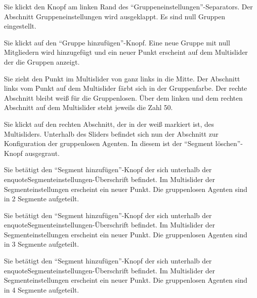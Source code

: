 \documentclass[parskip=full,11pt]{scrartcl}
\begin{document}
{Sie klickt den Knopf am linken Rand des \enquote{Gruppeneinstellungen}-Separators.}
{Der Abschnitt Gruppeneinstellungen wird ausgeklappt. Es sind null Gruppen eingestellt.}

{Sie klickt auf den \enquote{Gruppe hinzufügen}-Knopf.}
{Eine neue Gruppe mit null Mitgliedern wird hinzugefügt und ein neuer Punkt erscheint auf dem Multislider der die Gruppen anzeigt.}

{Sie zieht den Punkt im Multislider von ganz links in die Mitte.}
{Der Abschnitt links vom Punkt auf dem Multislider färbt sich in der Gruppenfarbe. Der rechte Abschnitt bleibt weiß für die Gruppenlosen. Über dem linken und dem rechten Abschnitt auf dem Multislider steht jeweils die Zahl 50.}

{Sie klickt auf den rechten Abschnitt, der in der weiß markiert ist, des Multisliders.}
{Unterhalb des Sliders befindet sich nun der Abschnitt zur Konfiguration der gruppenlosen Agenten. In diesem ist der \enquote{Segment löschen}-Knopf ausgegraut.}

{Sie betätigt den \enquote{Segment hinzufügen}-Knopf der sich unterhalb der enquote{Segmenteinstellungen}-Überschrift befindet.}
{Im Multislider der Segmenteinstellungen erscheint ein neuer Punkt. Die gruppenlosen Agenten sind in 2 Segmente aufgeteilt.}

{Sie betätigt den \enquote{Segment hinzufügen}-Knopf der sich unterhalb der enquote{Segmenteinstellungen}-Überschrift befindet.}
{Im Multislider der Segmenteinstellungen erscheint ein neuer Punkt. Die gruppenlosen Agenten sind in 3 Segmente aufgeteilt.}

{Sie betätigt den \enquote{Segment hinzufügen}-Knopf der sich unterhalb der enquote{Segmenteinstellungen}-Überschrift befindet.}
{Im Multislider der Segmenteinstellungen erscheint ein neuer Punkt. Die gruppenlosen Agenten sind in 4 Segmente aufgeteilt.}
\end{document}
